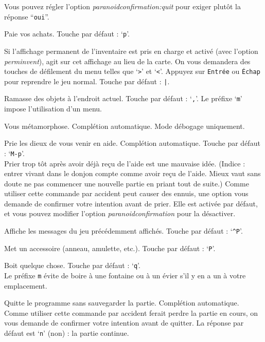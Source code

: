 \documentclass[titlepage]{article}
\begin{document}
\begin{description}[font=\mdseries\ttfamily]
Vous pouvez régler l'option
\textit{paranoid\textunderscore confirmation:quit}
pour exiger plutôt la réponse ``\texttt{oui}''.
\item[\#pay]
Paie vos achats. Touche par défaut : `\texttt{p}'.
\item[\#perminv]
Si l'affichage permanent de l'inventaire est pris en charge et activé (avec
l'option \textit{perm\textunderscore invent}), agit sur cet affichage au lieu de la carte.
On vous demandera des touches de défilement du menu telles
que `\texttt{>}' et `\texttt{<}'.
Appuyez sur \texttt{Entrée} ou \texttt{Échap} pour reprendre le jeu normal.
Touche par défaut : \texttt{|}.
\item[\#pickup]
Ramasse des objets à l'endroit actuel. Touche par défaut : `\texttt{,}'.
Le préfixe `\texttt{m}' impose l'utilisation d'un menu.
\item[\#polyself]
Vous métamorphose.
Complétion automatique.
Mode débogage uniquement.
\item[\#pray]
Prie les dieux de vous venir en aide. Complétion automatique. Touche par défaut : `\texttt{M-p}'.\\
Prier trop tôt après avoir déjà reçu de l'aide est une mauvaise idée.
(Indice : entrer vivant dans le donjon compte comme avoir reçu de l'aide.
Mieux vaut sans doute ne pas commencer une nouvelle partie en priant tout de suite.)
Comme utiliser cette commande par accident peut causer des ennuis, une
option vous demande de confirmer votre intention avant de prier.  Elle est activée
par défaut, et vous pouvez modifier l'option
\textit{paranoid\textunderscore confirmation}
pour la désactiver.
\item[\#prevmsg]
Affiche les messages du jeu précédemment affichés. Touche par défaut : `\texttt{\textasciicircum P}'.
\item[\#puton]
Met un accessoire (anneau, amulette, etc.). Touche par défaut : `\texttt{P}'.
\item[\#quaff]
Boit quelque chose. Touche par défaut : `\texttt{q}'.\\
Le préfixe \texttt{m} évite de boire à une fontaine ou à un évier
s'il y en a un à votre emplacement.
\item[\#quit]
Quitte le programme sans sauvegarder la partie. Complétion automatique.\\
Comme utiliser cette commande par accident ferait perdre la partie en cours,
on vous demande de confirmer votre intention avant de quitter.
La réponse par défaut est `\texttt{n}' (non) : la partie continue.

\end{description}
\end{document}
